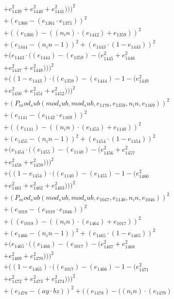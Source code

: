 \documentclass[10pt, a4paper]{article}
\begin{document}
\begin{small}
\begin{align*}
& + e_{1439}^{2} + e_{1440}^{2} + e_{1441}^{2})))^{2} \\
& + (e_{1360} - (e_{1361}  \cdot  e_{1375}))^{2} \\
& + ((e_{1360}) - ((n_in)  \cdot  (e_{1442}) + e_{1359}))^{2} \\
& + (e_{1444} - (n_in - 1))^{2} + (e_{1443}  \cdot  (1 - e_{1443}))^{2} \\
& + (e_{1443}  \cdot  ((e_{1444}) - (e_{1359}) - (e_{1445}^{2} + e_{1446}^{2} \\
& + e_{1447}^{2} + e_{1448}^{2})))^{2} \\
& + ((1 - e_{1443})  \cdot  ((e_{1359}) - (e_{1444}) - 1 - (e_{1449}^{2} \\
& + e_{1450}^{2} + e_{1451}^{2} + e_{1452}^{2})))^{2} \\
& + (P_mod_sub(mod_sub, mod_sub, e_{1170}, e_{1359}, n_in, e_{1169}))^{2} \\
& + (e_{1141} - (e_{1142}  \cdot  e_{1169}))^{2} \\
& + ((e_{1141}) - ((n_in)  \cdot  (e_{1453}) + e_{1140}))^{2} \\
& + (e_{1455} - (n_in - 1))^{2} + (e_{1454}  \cdot  (1 - e_{1454}))^{2} \\
& + (e_{1454}  \cdot  ((e_{1455}) - (e_{1140}) - (e_{1456}^{2} + e_{1457}^{2} \\
& + e_{1458}^{2} + e_{1459}^{2})))^{2} \\
& + ((1 - e_{1454})  \cdot  ((e_{1140}) - (e_{1455}) - 1 - (e_{1460}^{2} \\
& + e_{1461}^{2} + e_{1462}^{2} + e_{1463}^{2})))^{2} \\
& + (P_mod_sub(mod_sub, mod_sub, e_{1047}, e_{1140}, n_in, e_{1046}))^{2} \\
& + (e_{1018} - (e_{1019}  \cdot  e_{1046}))^{2} \\
& + ((e_{1018}) - ((n_in)  \cdot  (e_{1464}) + e_{1017}))^{2} \\
& + (e_{1466} - (n_in - 1))^{2} + (e_{1465}  \cdot  (1 - e_{1465}))^{2} \\
& + (e_{1465}  \cdot  ((e_{1466}) - (e_{1017}) - (e_{1467}^{2} + e_{1468}^{2} \\
& + e_{1469}^{2} + e_{1470}^{2})))^{2} \\
& + ((1 - e_{1465})  \cdot  ((e_{1017}) - (e_{1466}) - 1 - (e_{1471}^{2} \\
& + e_{1472}^{2} + e_{1473}^{2} + e_{1474}^{2})))^{2} \\
& + (e_{1478} - (ay  \cdot  bz))^{2} + ((e_{1478}) - ((n_in)  \cdot  (e_{1479}) \\

\end{align*}
\end{small}
\end{document}
